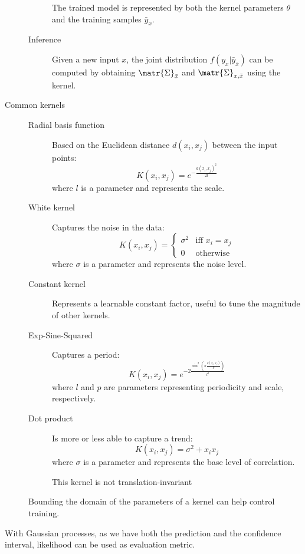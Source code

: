 \begin{description}
\begin{description}
                The trained model is represented by both the kernel parameters $\theta$ and the training samples $\bar{y}_x$.

            \item[Inference] 
                Given a new input $x$, the joint distribution $f(y_x | \bar{y}_{\bar{x}})$ can be computed by obtaining $\matr{\Sigma}_{\bar{x}}$ and $\matr{\Sigma}_{x, \bar{x}}$ using the kernel.
        \end{description}

    \item[Common kernels] \phantom{}
        \begin{description}
            \item[Radial basis function] 
                Based on the Euclidean distance $d(x_i, x_j)$ between the input points:
                \[ K(x_i, x_j) = e^{-\frac{d(x_i, x_j)^2}{2l}} \]
                where $l$ is a parameter and represents the scale.

            \item[White kernel]
                Captures the noise in the data:
                \[ K(x_i, x_j) = \begin{cases}
                    \sigma^2 & \text{iff $x_i = x_j$} \\
                    0 & \text{otherwise}
                \end{cases} \]
                where $\sigma$ is a parameter and represents the noise level.

            \item[Constant kernel]
                Represents a learnable constant factor, useful to tune the magnitude of other kernels.

            \item[Exp-Sine-Squared]
                Captures a period:
                \[ K(x_i, x_j) = e^{-2 \frac{\sin^2 \left( \pi \frac{d(x_i, x_j)}{p} \right)}{l^2}} \]
                where $l$ and $p$ are parameters representing periodicity and scale, respectively.

            \item[Dot product]
                Is more or less able to capture a trend:
                \[ K(x_i, x_j) = \sigma^2 + x_i x_j \]
                where $\sigma$ is a parameter and represents the base level of correlation.

                \begin{remark}
                    This kernel is not translation-invariant
                \end{remark}
        \end{description}

        \begin{remark}
            Bounding the domain of the parameters of a kernel can help control training.
        \end{remark}
\end{description}


\begin{remark}
    With Gaussian processes, as we have both the prediction and the confidence interval, likelihood can be used as evaluation metric.
\end{remark}